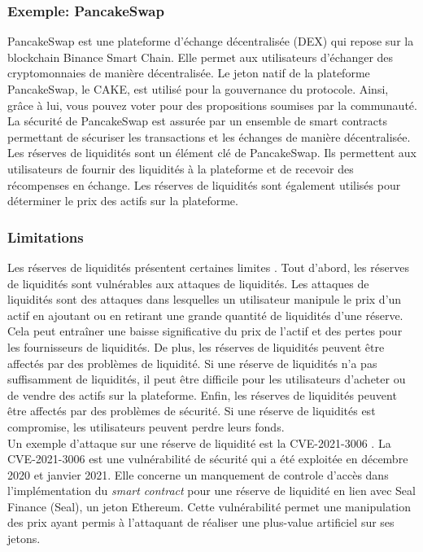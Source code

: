 \subsubsection{Exemple: PancakeSwap}
PancakeSwap est une plateforme d’échange décentralisée (DEX) qui repose sur la \gls{blockchain} Binance Smart Chain. \cite{augustin2022yield} Elle permet aux utilisateurs d’échanger des 
cryptomonnaies de manière décentralisée. Le jeton natif de la plateforme PancakeSwap, le CAKE, est utilisé 
pour la gouvernance du protocole. Ainsi, grâce à lui, vous pouvez voter pour des propositions soumises par la communauté. La sécurité de PancakeSwap est assurée 
par un ensemble de smart contracts permettant de sécuriser les transactions et les échanges de manière décentralisée. Les réserves de liquidités sont un 
élément clé de PancakeSwap. Ils permettent aux utilisateurs de fournir des liquidités à la plateforme et de recevoir des récompenses en échange. Les réserves 
de liquidités sont également utilisés pour déterminer le prix des actifs sur la plateforme.

\subsubsection{Limitations}
Les réserves de liquidités présentent certaines limites \cite{caldarelli2021blockchain}. Tout d’abord, les réserves de liquidités sont vulnérables aux attaques de liquidités. Les attaques 
de liquidités sont des attaques dans lesquelles un utilisateur manipule le prix d’un actif en ajoutant ou en retirant une grande quantité de liquidités d’une 
réserve. Cela peut entraîner une baisse significative du prix de l’actif et des pertes pour les fournisseurs de liquidités. De plus, les réserves de liquidités 
peuvent être affectés par des problèmes de liquidité. Si une réserve de liquidités n’a pas suffisamment de liquidités, il peut être difficile pour les 
utilisateurs d’acheter ou de vendre des actifs sur la plateforme. Enfin, les réserves de liquidités peuvent être affectés par des problèmes de sécurité. Si 
une réserve de liquidités est compromise, les utilisateurs peuvent perdre leurs fonds. \\
Un exemple d'attaque sur une réserve de liquidité est la CVE-2021-3006 \cite{nvd2021-3006,blocksec2021Seal}. La CVE-2021-3006 est une vulnérabilité de sécurité qui a été exploitée en décembre 
2020 et janvier 2021. Elle concerne un manquement de controle d'accès dans l’implémentation du \textit{\gls{smart contract}} pour une réserve de liquidité en lien avec 
Seal Finance (Seal), un jeton \gls{Ethereum}. Cette vulnérabilité permet une manipulation des prix ayant permis à l'attaquant de réaliser une plus-value artificiel 
sur ses jetons.
